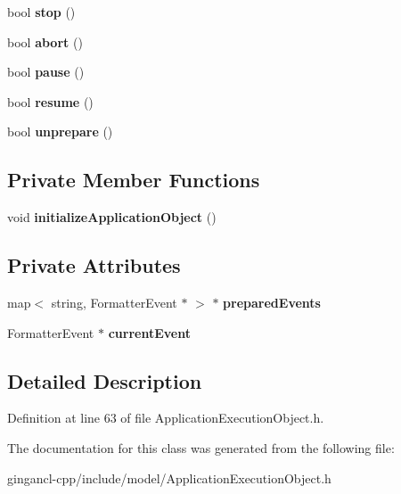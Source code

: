 \begin{CompactItemize}
\item 
bool \textbf{stop} ()\label{classbr_1_1pucrio_1_1telemidia_1_1ginga_1_1ncl_1_1model_1_1components_1_1ApplicationExecutionObject_68a350717fe6bf9012843e7c977d87b2}

\item 
bool \textbf{abort} ()\label{classbr_1_1pucrio_1_1telemidia_1_1ginga_1_1ncl_1_1model_1_1components_1_1ApplicationExecutionObject_e75017b64297bc5a74260a768fb86cf1}

\item 
bool \textbf{pause} ()\label{classbr_1_1pucrio_1_1telemidia_1_1ginga_1_1ncl_1_1model_1_1components_1_1ApplicationExecutionObject_2853250ac5b9806e29d41f6f37b3b7f0}

\item 
bool \textbf{resume} ()\label{classbr_1_1pucrio_1_1telemidia_1_1ginga_1_1ncl_1_1model_1_1components_1_1ApplicationExecutionObject_28614c8a58170f93be7e0eab1c70a2bd}

\item 
bool \textbf{unprepare} ()\label{classbr_1_1pucrio_1_1telemidia_1_1ginga_1_1ncl_1_1model_1_1components_1_1ApplicationExecutionObject_ddc43e37140881425a111f275ad1c1da}

\end{CompactItemize}
\subsection*{Private Member Functions}
\begin{CompactItemize}
\item 
void \textbf{initializeApplicationObject} ()\label{classbr_1_1pucrio_1_1telemidia_1_1ginga_1_1ncl_1_1model_1_1components_1_1ApplicationExecutionObject_b4de2820c65c9d06e5739a173b8c981b}

\end{CompactItemize}
\subsection*{Private Attributes}
\begin{CompactItemize}
\item 
map$<$ string, FormatterEvent $\ast$ $>$ $\ast$ {\bf preparedEvents}\label{classbr_1_1pucrio_1_1telemidia_1_1ginga_1_1ncl_1_1model_1_1components_1_1ApplicationExecutionObject_a43d2bb8f3756816973fe3cefcdcd569}

\item 
FormatterEvent $\ast$ {\bf currentEvent}\label{classbr_1_1pucrio_1_1telemidia_1_1ginga_1_1ncl_1_1model_1_1components_1_1ApplicationExecutionObject_513496d6a12bbfe8aa02a68a3572701c}

\end{CompactItemize}


\subsection{Detailed Description}




Definition at line 63 of file ApplicationExecutionObject.h.

The documentation for this class was generated from the following file:\begin{CompactItemize}
\item 
gingancl-cpp/include/model/ApplicationExecutionObject.h\end{CompactItemize}

